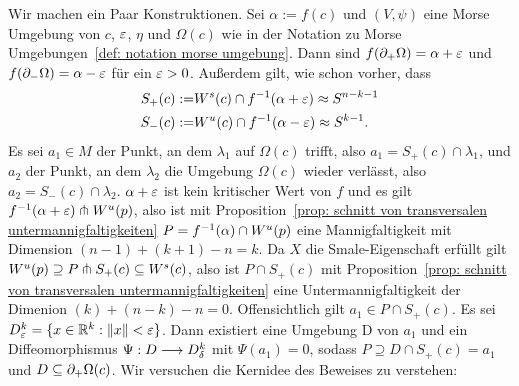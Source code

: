 \begin{bigproof}
    Wir machen ein Paar Konstruktionen. Sei $\alpha := f(c)$ und $(V, \psi)$ eine Morse Umgebung von
    $c$, $\varepsilon$, $\eta$ und $\Omega(c)$ wie in der Notation zu Morse 
    Umgebungen~\ref{def: notation morse umgebung}. Dann sind 
    $f({ \partial }_+ \Omega) = \alpha + \varepsilon$ und $f({ \partial }_- \Omega) = \alpha - \varepsilon$ für ein $\varepsilon > 0$.
    Außerdem gilt, wie schon vorher, dass 
    \begin{align*}
        S_+ (c) := & { W^s } (c) \cap f^{-1}(\alpha + \varepsilon) \approx S^{n - k - 1} \\
        S_- (c) := & { W^u } (c) \cap f^{-1}(\alpha - \varepsilon) \approx S^{k - 1} .
    \end{align*}
    Es sei $a_1 \in M$ der Punkt, an dem $\lambda_1$ auf $\Omega(c)$ trifft, also 
    $a_1 = S_+ (c) \cap \lambda_1$, und $a_2$ der Punkt, an dem $\lambda_2$ die Umgebung $\Omega (c)$ 
    wieder verlässt, also $a_2 = S_- (c) \cap \lambda_2$. $\alpha + \varepsilon$ ist kein kritischer Wert 
    von $f$ und es gilt $f^{-1}(\alpha + \varepsilon) \pitchfork { W^u } (p)$, also ist mit 
    Proposition~\ref{prop: schnitt von transversalen untermannigfaltigkeiten} 
    $P = f^{-1}(\alpha) \cap { W^u } (p)$ eine Mannigfaltigkeit mit Dimension $(n - 1) + (k + 1) - n = k$.
    Da $X$ die Smale-Eigenschaft erfüllt gilt 
    ${ W^u } (p) \supseteq P \pitchfork S_+ (c) \subseteq { W^s }(c)$, also ist $P \cap S_+ (c)$
    mit Proposition~\ref{prop: schnitt von transversalen untermannigfaltigkeiten} eine 
    Untermannigfaltigkeit der Dimenion $(k) + (n - k) - n = 0$. Offensichtlich gilt 
    $a_1 \in P \cap S_+ (c)$. Es sei $D^k_{\varepsilon} = \{ x \in { \mathbb R }^k : \| x \| < \varepsilon \}$. Dann existiert 
    eine Umgebung D von $a_1$ und ein Diffeomorphismus $\Psi : D \longrightarrow D^k_{\delta}$ mit 
    $\Psi(a_1) = 0$, sodass $P \supseteq D \cap S_+ (c) = a_1$ und $D \subseteq { \partial }_+ \Omega (c)$.
    Wir versuchen die Kernidee des Beweises zu verstehen:


\end{bigproof}
